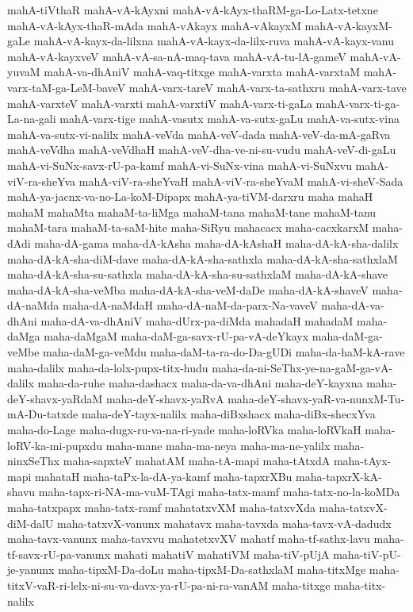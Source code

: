 {mahA-tiVthaR
mahA-vA-kAyxni
mahA-vA-kAyx-thaRM-ga-Lo-Latx-tetxne
mahA-vA-kAyx-thaR-mAda
mahA-vAkayx
mahA-vAkayxM
mahA-vA-kayxM-gaLe
mahA-vA-kayx-da-lilxna
mahA-vA-kayx-da-lilx-ruva
mahA-vA-kayx-vanu
mahA-vA-kayxveV
mahA-vA-sa-nA-maq-tava
mahA-vA-tu-lA-gameV
mahA-vA-yuvaM
mahA-va-dhAniV
mahA-vaq-titxge
mahA-varxta
mahA-varxtaM
mahA-varx-taM-ga-LeM-baveV
mahA-varx-tareV
mahA-varx-ta-sathxru
mahA-varx-tave
mahA-varxteV
mahA-varxti
mahA-varxtiV
mahA-varx-ti-gaLa
mahA-varx-ti-ga-La-na-gali
mahA-varx-tige
mahA-vasutx
mahA-va-sutx-gaLu
mahA-va-sutx-vina
mahA-va-sutx-vi-nalilx
mahA-veVda
mahA-veV-dada
mahA-veV-da-mA-gaRva
mahA-veVdha
mahA-veVdhaH
mahA-veV-dha-ve-ni-su-vudu
mahA-veV-di-gaLu
mahA-vi-SuNx-savx-rU-pa-kamf
mahA-vi-SuNx-vina
mahA-vi-SuNxvu
mahA-viV-ra-sheYva
mahA-viV-ra-sheYvaH
mahA-viV-ra-sheYvaM
mahA-vi-sheV-Sada
mahA-ya-jacnx-va-no-La-koM-Dipapx
mahA-ya-tiVM-darxru
maha
mahaH
mahaM
mahaMta
mahaM-ta-liMga
mahaM-tana
mahaM-tane
mahaM-tanu
mahaM-tara
mahaM-ta-saM-hite
maha-SiRyu
mahacacx
maha-cacxkarxM
maha-dAdi
maha-dA-gama
maha-dA-kAsha
maha-dA-kAshaH
maha-dA-kA-sha-dalilx
maha-dA-kA-sha-diM-dave
maha-dA-kA-sha-sathxla
maha-dA-kA-sha-sathxlaM
maha-dA-kA-sha-su-sathxla
maha-dA-kA-sha-su-sathxlaM
maha-dA-kA-shave
maha-dA-kA-sha-veMba
maha-dA-kA-sha-veM-daDe
maha-dA-kA-shaveV
maha-dA-naMda
maha-dA-naMdaH
maha-dA-naM-da-parx-Na-vaveV
maha-dA-va-dhAni
maha-dA-va-dhAniV
maha-dUrx-pa-diMda
mahadaH
mahadaM
maha-daMga
maha-daMgaM
maha-daM-ga-savx-rU-pa-vA-deYkayx
maha-daM-ga-veMbe
maha-daM-ga-veMdu
maha-daM-ta-ra-do-Da-gUDi
maha-da-haM-kA-rave
maha-dalilx
maha-da-lolx-pupx-titx-hudu
maha-da-ni-SeThx-ye-na-gaM-ga-vA-dalilx
maha-da-ruhe
maha-dashacx
maha-da-va-dhAni
maha-deY-kayxna
maha-deY-shavx-yaRdaM
maha-deY-shavx-yaRvA
maha-deY-shavx-yaR-va-nunxM-Tu-mA-Du-tatxde
maha-deY-tayx-nalilx
maha-diBxshacx
maha-diBx-shecxYva
maha-do-Lage
maha-dugx-ru-va-na-ri-yade
maha-loRVka
maha-loRVkaH
maha-loRV-ka-mi-pupxdu
maha-mane
maha-ma-neya
maha-ma-ne-yalilx
maha-ninxSeThx
maha-sapxteV
mahatAM
maha-tA-mapi
maha-tAtxdA
maha-tAyx-mapi
mahataH
maha-taPx-la-dA-ya-kamf
maha-tapxrXBu
maha-tapxrX-kA-shavu
maha-tapx-ri-NA-ma-vuM-TAgi
maha-tatx-mamf
maha-tatx-no-la-koMDa
maha-tatxpapx
maha-tatx-ramf
mahatatxvXM
maha-tatxvXda
maha-tatxvX-diM-dalU
maha-tatxvX-vanunx
mahatavx
maha-tavxda
maha-tavx-vA-dadudx
maha-tavx-vanunx
maha-tavxvu
mahatetxvXV
mahatf
maha-tf-sathx-lavu
maha-tf-savx-rU-pa-vanunx
mahati
mahatiV
mahatiVM
maha-tiV-pUjA
maha-tiV-pU-je-yanunx
maha-tipxM-Da-doLu
maha-tipxM-Da-sathxlaM
maha-titxMge
maha-titxV-vaR-ri-lelx-ni-su-va-davx-ya-rU-pa-ni-ra-vanAM
maha-titxge
maha-titx-nalilx
}
